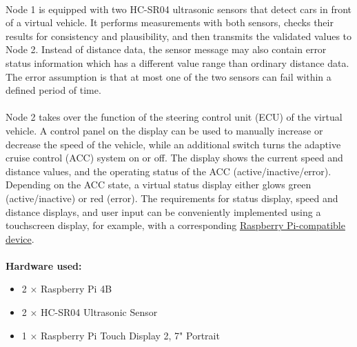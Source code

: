 \paragraph{}
Node 1 is equipped with two HC-SR04 ultrasonic sensors that detect cars in front of a virtual vehicle. It performs measurements with both sensors, checks their results for consistency and plausibility, and then transmits the validated values to Node 2. Instead of distance data, the sensor message may also contain error status information which has a different value range than ordinary distance data. The error assumption is that at most one of the two sensors can fail within a defined period of time.

\paragraph{}
Node 2 takes over the function of the steering control unit (ECU) of the virtual vehicle. A control panel on the display can be used to manually increase or decrease the speed of the vehicle, while an additional switch turns the adaptive cruise control (ACC) system on or off. The display shows the current speed and distance values, and the operating status of the ACC (active/inactive/error). Depending on the ACC state, a virtual status display either glows green (active/inactive) or red (error). The requirements for status display, speed and distance displays, and user input can be conveniently implemented using a touchscreen display, for example, with a corresponding \href{https://www.berrybase.at/raspberry-pi-touch-display-2-7-portrait} {Raspberry Pi-compatible device}. 

\paragraph{}
\textbf{Hardware used:}
\begin{itemize}
    \item 2 × Raspberry Pi 4B
    \item 2 × HC-SR04 Ultrasonic Sensor
    \item 1 × Raspberry Pi Touch Display 2, 7" Portrait
\end{itemize}

